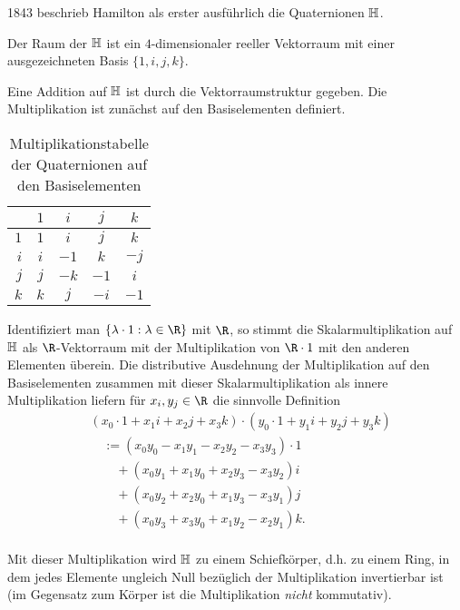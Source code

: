 1843 beschrieb Hamilton als erster ausführlich die Quaternionen $\mathbb{H}$.

\begin{df*}
	Der Raum der  $\mathbb{H}$ ist ein $4$-dimensionaler reeller Vektorraum mit einer ausgezeichneten Basis $\{1, i, j, k\}$.

	Eine Addition auf $\mathbb{H}$ ist durch die Vektorraumstruktur gegeben.
	Die Multiplikation ist zunächst auf den Basiselementen definiert.
	\begin{table}[ht]
		\centering
		\begin{tabular}{r|cccc}
			  & $1$ & $i$ & $j$ & $k$ \\ \hline
			$1$ & $1$ & $i$ & $j$ & $k$ \\
			$i$ & $i$ & $-1$ & $k$ & $-j$ \\
			$j$ & $j$ & $-k$ & $-1$ & $i$ \\
			$k$ & $k$ & $j$ & $-i$ & $-1$
		\end{tabular}
		\caption{Multiplikationstabelle der Quaternionen auf den Basiselementen}
	\end{table}

	Identifiziert man $\{ \lambda \cdot 1 : \lambda \in \R \}$ mit $\R$, so stimmt die Skalarmultiplikation auf $\mathbb{H}$ als $\R$-Vektorraum mit der Multiplikation von $\R \cdot 1$ mit den anderen Elementen überein.
	Die distributive Ausdehnung der Multiplikation auf den Basiselementen zusammen mit dieser Skalarmultiplikation als innere Multiplikation liefern für $x_i, y_j \in \R$ die sinnvolle Definition
	\begin{align*}
		&(x_0 \cdot 1  + x_1 i + x_2 j + x_3 k) \cdot (y_0 \cdot 1 + y_1 i + y_2 j + y_3 k) \\
		&\quad := ( x_0 y_0 - x_1 y_1 - x_2 y_2 - x_3 y_3) \cdot 1 \\
		&\qquad + ( x_0 y_1 + x_1 y_0 + x_2 y_3 - x_3 y_2) i \\
		&\qquad + ( x_0 y_2 + x_2 y_0 + x_1 y_3 - x_3 y_1) j \\
		&\qquad + ( x_0 y_3 + x_3 y_0 + x_1 y_2 - x_2 y_1) k. \\
	\end{align*}
	\begin{note}
		Mit dieser Multiplikation wird $\mathbb{H}$ zu einem Schiefkörper, d.h. zu einem Ring, in dem jedes Elemente ungleich Null bezüglich der Multiplikation invertierbar ist (im Gegensatz zum Körper ist die Multiplikation \emph{nicht} kommutativ).
	\end{note}
\end{df*}

